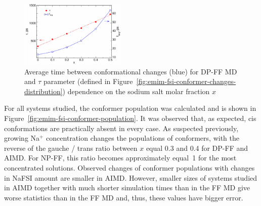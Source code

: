 \begin{figure}[H]
    \centering
    \includegraphics[width=0.45\textwidth]{img/3-structural-data-from-md-simulations/1-emim-fsi/conformers/conformer-changes-averages.png}
    \singlespacing
    \caption{Average time between conformational changes (blue) for DP-FF MD and $\tau$ parameter (defined in Figure~\ref{fig:emim-fsi-conformer-changes-distribution}) dependence on the sodium salt molar fraction $x$}
    \label{fig:emim-fsi-conformer-changes-averages}
\end{figure}

For all systems studied, the conformer population was calculated and is shown in Figure~\ref{fig:emim-fsi-conformer-population}. It was observed that, as expected, cis conformations are practically absent in every case. As suspected previously, growing Na$^{+}$ concentration changes the populations of conformers, with the reverse of the gauche / trans ratio between $x$ equal 0.3 and 0.4 for DP-FF and AIMD. For NP-FF, this ratio becomes approximately equal~1 for the most concentrated solutions. Observed changes of conformer populations with changes in NaFSI amount are smaller in AIMD. However, smaller sizes of systems studied in AIMD together with much shorter simulation times than in the FF MD give worse statistics than in the FF MD and, thus, these values have bigger error.

